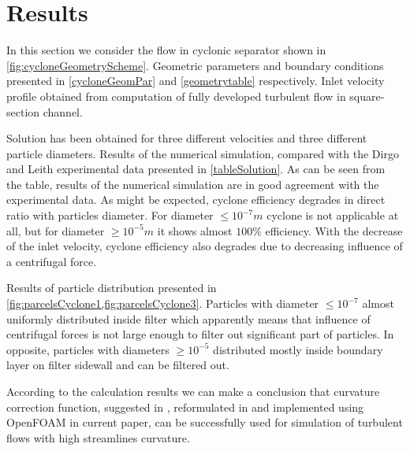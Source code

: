 \documentclass[a4paper]{jpconf}
\begin{document}
\section{Results}

In this section we consider the flow in cyclonic separator shown in \cref{fig:cycloneGeometryScheme}. Geometric parameters and boundary conditions presented in \cref{cycloneGeomPar} and \cref{geometrytable} respectively. Inlet velocity profile obtained from computation of fully developed turbulent flow in square-section channel.

Solution has been obtained for three different velocities and three different particle diameters. Results of the numerical simulation, compared with the Dirgo and Leith\cite{DirgoLeith} experimental data presented in \cref{tableSolution}. As can be seen from the table, results of the numerical simulation are in good agreement with the experimental data. As might be expected, cyclone efficiency degrades in direct ratio with particles diameter. For diameter $\le 10^{-7}m$ cyclone is not applicable at all, but for diameter $\ge 10^{-5}m$ it shows almost $100\%$ efficiency. With the decrease of the inlet velocity, cyclone efficiency also degrades due to decreasing influence of a centrifugal force.

Results of particle distribution presented in \cref{fig:parcelsCyclone1,fig:parcelsCyclone3}. Particles with diameter $\le 10^{-7}$ almost uniformly distributed inside filter which apparently means that influence of centrifugal forces is not large enough to filter out significant part of particles. In opposite, particles with diameters $\ge 10^{-5}$ distributed mostly inside boundary layer on filter sidewall and can be filtered out.

According to the calculation results we can make a conclusion that curvature correction function, suggested in \cite{ShurSpallart}, reformulated in \cite{Smirnov} and implemented using OpenFOAM in current paper, can be successfully used for simulation of turbulent flows with high streamlines curvature.
\end{document}
